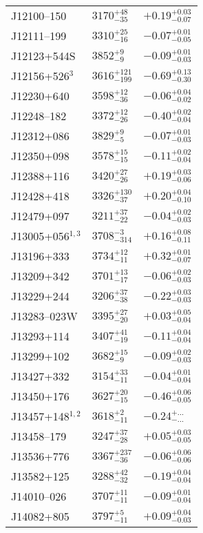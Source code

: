 \documentclass{aa}
\begin{document}
\begin{appendix}
\begin{center}
\begin{xtabular}{lll}
J12100--150 & $3170_{-35}^{+48}$ & $+0.19_{-0.07}^{+0.03}$ \\
J12111--199 & $3310_{-16}^{+25}$ & $-0.07_{-0.05}^{+0.01}$ \\
J12123+544S & $3852_{-9}^{+9}$ & $-0.09_{-0.03}^{+0.01}$ \\
J12156+526$^{3}$ & $3616_{-199}^{+121}$ & $-0.69_{-0.30}^{+0.13}$ \\
J12230+640 & $3598_{-36}^{+12}$ & $-0.06_{-0.02}^{+0.04}$ \\
J12248--182 & $3372_{-26}^{+12}$ & $-0.40_{-0.04}^{+0.02}$ \\
J12312+086 & $3829_{-5}^{+9}$ & $-0.07_{-0.03}^{+0.01}$ \\
J12350+098 & $3578_{-15}^{+15}$ & $-0.11_{-0.04}^{+0.02}$ \\
J12388+116 & $3420_{-26}^{+27}$ & $+0.19_{-0.06}^{+0.03}$ \\
J12428+418 & $3326_{-37}^{+130}$ & $+0.20_{-0.10}^{+0.04}$ \\
J12479+097 & $3211_{-22}^{+37}$ & $-0.04_{-0.03}^{+0.02}$ \\
J13005+056$^{1,3}$ & $3708_{-314}^{-3}$ & $+0.16_{-0.11}^{+0.08}$ \\
J13196+333 & $3734_{-11}^{+12}$ & $+0.32_{-0.07}^{+0.01}$ \\
J13209+342 & $3701_{-17}^{+13}$ & $-0.06_{-0.03}^{+0.02}$ \\
J13229+244 & $3206_{-38}^{+37}$ & $-0.22_{-0.03}^{+0.03}$ \\
J13283--023W & $3395_{-20}^{+27}$ & $+0.03_{-0.04}^{+0.05}$ \\
J13293+114 & $3407_{-19}^{+41}$ & $-0.11_{-0.04}^{+0.04}$ \\
J13299+102 & $3682_{-9}^{+15}$ & $-0.09_{-0.03}^{+0.02}$ \\
J13427+332 & $3154_{-11}^{+33}$ & $-0.04_{-0.04}^{+0.01}$ \\
J13450+176 & $3627_{-15}^{+20}$ & $-0.46_{-0.05}^{+0.06}$ \\
J13457+148$^{1,2}$ & $3618_{-11}^{+2}$ & $-0.24_{-...}^{+...}$ \\
J13458--179 & $3247_{-28}^{+37}$ & $+0.05_{-0.05}^{+0.03}$ \\
J13536+776 & $3367_{-36}^{+237}$ & $-0.06_{-0.06}^{+0.06}$ \\
J13582+125 & $3288_{-32}^{+42}$ & $-0.19_{-0.04}^{+0.04}$ \\
J14010--026 & $3707_{-11}^{+11}$ & $-0.09_{-0.04}^{+0.01}$ \\
J14082+805 & $3797_{-11}^{+5}$ & $+0.09_{-0.03}^{+0.04}$ \\

\end{xtabular}
\end{center}
\end{appendix}
\end{document}
